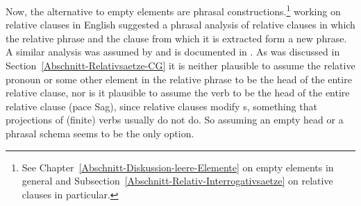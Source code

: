 Now, the alternative to empty elements are phrasal constructions.\footnote{
See Chapter~\ref{Abschnitt-Diskussion-leere-Elemente} on empty elements in general and
Subsection~\ref{Abschnitt-Relativ-Interrogativsaetze} on relative clauses in particular.
} \cite{Sag97a} working on relative clauses in
English suggested a phrasal analysis of relative clauses in which the relative phrase and the clause
from which it is extracted form a new phrase. A similar analysis was assumed by
\citet{Babel} and is documented in . As was discussed in Section~\ref{Abschnitt-Relativsaetze-CG} it is
neither plausible to assume the relative pronoun or some other element in the relative phrase to be the
head of the entire relative clause, nor is it plausible to assume the verb to be the head of the entire
relative clause (pace Sag), since relative clauses modify \nbar{}s, something that projections
of (finite) verbs usually do not do. 
So assuming an empty head or a phrasal schema seems to be the
only option.

